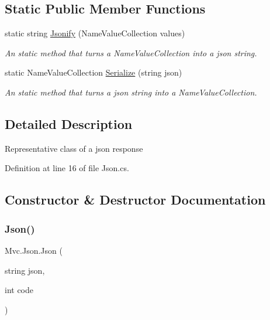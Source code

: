 \subsection*{Static Public Member Functions}
\begin{DoxyCompactItemize}
\item 
static string \hyperlink{class_mvc_1_1_json_a7f2eac02ea84b7b0c9c277d54e347c8a}{Jsonify} (Name\+Value\+Collection values)
\begin{DoxyCompactList}\small\item\em An static method that turns a Name\+Value\+Collection into a json string. \end{DoxyCompactList}\item 
static Name\+Value\+Collection \hyperlink{class_mvc_1_1_json_a6876cfad310dbe0a704204bec09c9d66}{Serialize} (string json)
\begin{DoxyCompactList}\small\item\em An static method that turns a json string into a Name\+Value\+Collection. \end{DoxyCompactList}\end{DoxyCompactItemize}


\subsection{Detailed Description}
Representative class of a json response 



Definition at line 16 of file Json.\+cs.



\subsection{Constructor \& Destructor Documentation}
\mbox{\label{class_mvc_1_1_json_a0b86fdb1b35bca88ae21f0f2282a710d}} 
\subsubsection{\texorpdfstring{Json()}{Json()}}
{\footnotesize\ttfamily Mvc.\+Json.\+Json (\begin{DoxyParamCaption}\item[{string}]{json,  }\item[{int}]{code }\end{DoxyParamCaption})}




